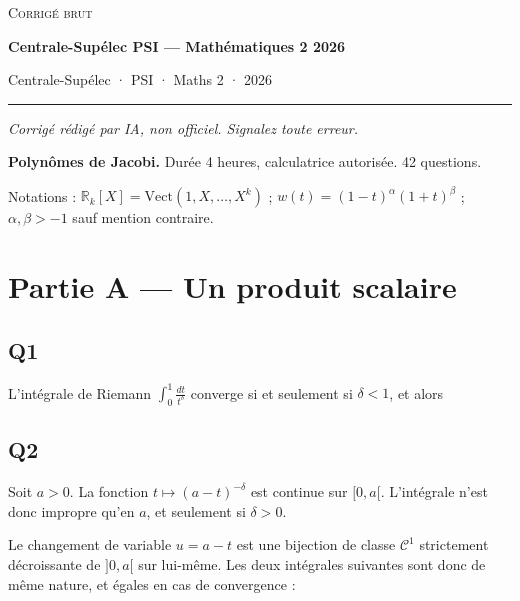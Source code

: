 \documentclass[11pt,a4paper]{article}
\newcommand{\equationajustee}[1]{%
  \sbox{\boiteequation}{$\displaystyle #1$}%
  \ifdim\wd\boiteequation>\linewidth
    \[\resizebox{\linewidth}{!}{\usebox{\boiteequation}}\]%
  \else
    \[#1\]%
  \fi}
\begin{document}
\thispagestyle{plain}
\begin{center}
  {\small\scshape Corrigé brut}\par\smallskip
  {\LARGE\bfseries Centrale-Supélec PSI — Mathématiques 2 2026\par}\medskip
  {\large Centrale-Supélec · PSI · Maths 2 · 2026\par}
\end{center}
\vspace{2pt}\hrule\vspace{8pt}

\emph{Corrigé rédigé par IA, non officiel. Signalez toute erreur.}

\textbf{Polynômes de Jacobi.} Durée 4 heures, calculatrice autorisée. 42 questions.

Notations : \(\mathbb R_k[X]=\mathrm{Vect}(1,X,\dots,X^k)\) ; \(w(t)=(1-t)^\alpha(1+t)^\beta\) ; \(\alpha,\beta>-1\) sauf mention contraire.

\hypertarget{partie-a-un-produit-scalaire}{%
\section{Partie A --- Un produit scalaire}\label{partie-a-un-produit-scalaire}}

\hypertarget{q1}{%
\subsection{Q1}\label{q1}}

L'intégrale de Riemann \(\displaystyle\int_0^1\frac{dt}{t^\delta}\) converge si et seulement si \(\delta<1\), et alors

\equationajustee{\boxed{\begin{aligned}\int_0^1\frac{dt}{t^\delta}&=\Big[\frac{t^{1-\delta}}{1-\delta}\Big]_0^1\\&=\frac1{1-\delta}.\end{aligned}}}

\hypertarget{q2}{%
\subsection{Q2}\label{q2}}

Soit \(a>0\). La fonction \(t\mapsto(a-t)^{-\delta}\) est continue sur \([0,a[\). L'intégrale n'est donc impropre qu'en \(a\), et seulement si \(\delta>0\).

Le changement de variable \(u=a-t\) est une bijection de classe \(\mathcal C^1\) strictement décroissante de \(]0,a[\) sur lui-même. Les deux intégrales suivantes sont donc de même nature, et égales en cas de convergence :
\end{document}
